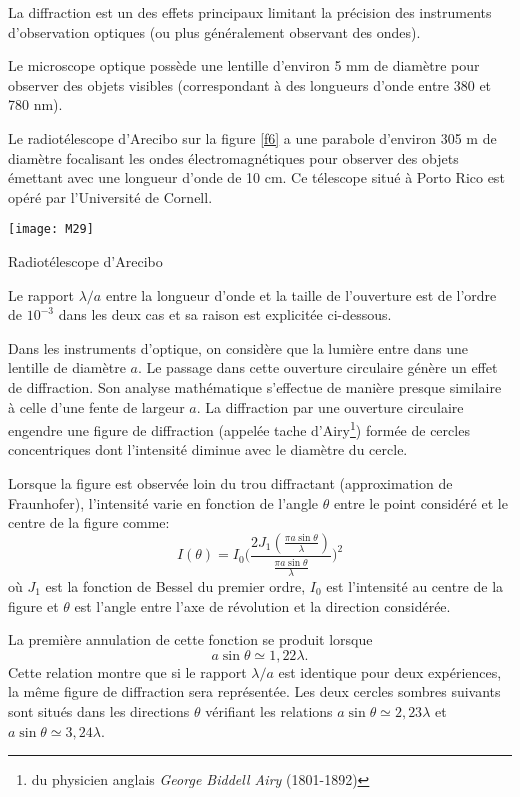 La diffraction est un des effets principaux limitant la précision des instruments d'observation optiques (ou plus généralement observant des ondes).

\noindent Le microscope optique possède une lentille d'environ 5 mm de diamètre pour observer des objets visibles (correspondant à des longueurs d'onde entre 380 et 780 nm).

\noindent Le radiotélescope d'Arecibo sur la figure \ref{f6} a une parabole d'environ 305 m de diamètre focalisant les ondes électromagnétiques pour observer des objets émettant avec une longueur d'onde de 10 cm. Ce télescope situé à Porto Rico est opéré par l'Université de Cornell.

\begin{marginfigure}[-2cm]
\texttt{[image: M29]}
\caption{Radiotélescope d'Arecibo}
\label{f6}
\end{marginfigure}

\noindent Le rapport $\lambda/a$ entre la longueur d'onde et la taille de l'ouverture est de l'ordre de $10^{-3}$ dans les deux cas et sa raison est explicitée ci-dessous.

\noindent Dans les instruments d'optique, on considère que la lumière entre dans une lentille de diamètre $a$. Le passage dans cette ouverture circulaire génère un effet de diffraction. Son analyse mathématique s'effectue de manière presque similaire à celle d'une fente de largeur $a$. La diffraction par une ouverture circulaire engendre une figure de diffraction (appelée tache d'Airy\footnote{du physicien anglais \textit{George Biddell Airy} (1801-1892)}) formée de cercles concentriques dont l'intensité diminue avec le diamètre du cercle. 

\noindent Lorsque la figure est observée loin du trou diffractant (approximation de Fraunhofer), l'intensité varie en fonction de l'angle $\theta$ entre le point considéré et le centre de la figure comme:
$$
    I(\theta)=I_0\bigg(\frac{2J_1(\frac{\pi a\sin\theta}{\lambda})}{\frac{\pi a\sin\theta}{\lambda}}\bigg)^2
$$
où $J_1$ est la fonction de Bessel du premier ordre, $I_0$ est l'intensité au centre de la figure et $\theta$ est l'angle entre l'axe de révolution et la direction considérée.

\noindent La première annulation de cette fonction se produit lorsque 
$$
    a\sin\theta\simeq1,22\lambda.
$$
Cette relation montre que si le rapport $\lambda/a$ est identique pour deux expériences, la même figure de diffraction sera représentée. Les deux cercles sombres suivants sont situés dans les directions $\theta$ vérifiant les relations $a\sin\theta\simeq2,23\lambda$ et $a\sin\theta\simeq3,24\lambda$.

